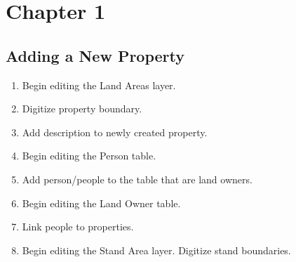 \documentclass[letterpaper,11pt, titlepage]{article}
\begin{document}
\section{Chapter 1}
\subsection{Adding a New Property}
\begin{enumerate}
\item  Begin editing the Land Areas layer.
\item Digitize property boundary.
\item Add description to newly created property.
\item Begin editing the Person table.
\item Add person/people to the table that are land owners.
\item  Begin editing the Land Owner table.
\item  Link people to properties.
\item  Begin editing the Stand Area layer.
\Item Digitize stand boundaries.
\end{enumerate}
\end{document}
